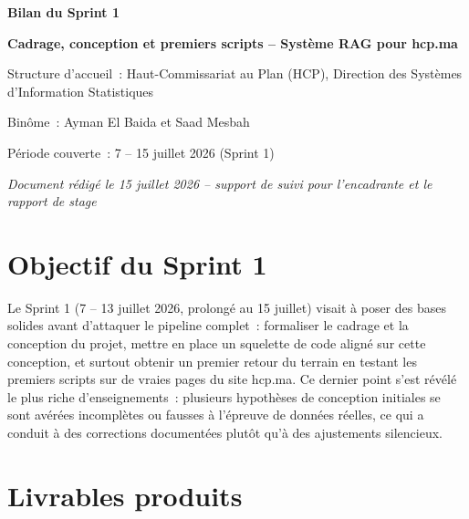 \documentclass[11pt,a4paper]{article}
\begin{document}
\begin{titlepage}
\centering
\vspace*{2cm}
{\Huge\bfseries\color{navy} Bilan du Sprint 1\par}
\vspace{0.5cm}
{\Large\bfseries\color{gold} Cadrage, conception et premiers scripts -- Syst\`eme RAG pour hcp.ma\par}
\vspace{1.5cm}
{\large\color{greytext} Structure d'accueil~: Haut-Commissariat au Plan (HCP), Direction des Syst\`emes d'Information Statistiques\par}
\vspace{0.3cm}
{\large\color{greytext} Bin\^ome~: Ayman El Baida et Saad Mesbah\par}
\vspace{0.3cm}
{\large\color{greytext} P\'eriode couverte~: 7 -- 15 juillet 2026 (Sprint 1)\par}
\vspace{0.3cm}
{\large\itshape\color{greytext} Document r\'edig\'e le 15 juillet 2026 -- support de suivi pour l'encadrante et le rapport de stage\par}
\vfill
\end{titlepage}

\tableofcontents
\newpage

\section{Objectif du Sprint 1}
Le Sprint 1 (7 -- 13 juillet 2026, prolong\'e au 15 juillet) visait \`a poser des bases solides avant d'attaquer le pipeline complet~: formaliser le cadrage et la conception du projet, mettre en place un squelette de code align\'e sur cette conception, et surtout obtenir un premier retour du terrain en testant les premiers scripts sur de vraies pages du site hcp.ma. Ce dernier point s'est r\'ev\'el\'e le plus riche d'enseignements~: plusieurs hypoth\`eses de conception initiales se sont av\'er\'ees incompl\`etes ou fausses \`a l'\'epreuve de donn\'ees r\'eelles, ce qui a conduit \`a des corrections document\'ees plut\^ot qu'\`a des ajustements silencieux.

\section{Livrables produits}
\end{document}
